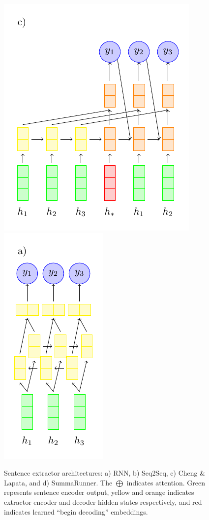 \begin{figure}
  \includegraphics[scale=.7]{figures/clextractor.pdf}
  \includegraphics[scale=.7]{figures/rnnextractor.pdf}
  \caption{Sentence extractor architectures: a) RNN, b) Seq2Seq,
  c) Cheng \& Lapata, and d) SummaRunner. The $\bigoplus$ indicates 
  attention. Green repesents sentence encoder output, yellow and orange
  indicates
  extractor encoder and decoder hidden states respectively, and red indicates
  learned ``begin decoding'' embeddings. }
  \label{fig:extractors}
\end{figure}

